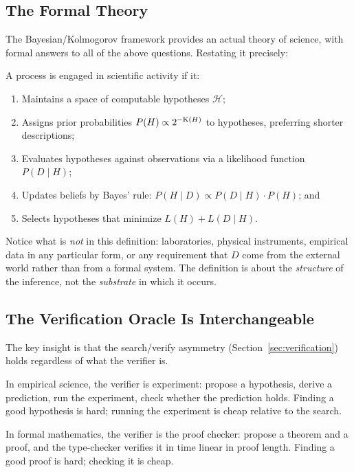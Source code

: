 \subsection{The Formal Theory}

The Bayesian/Kolmogorov framework provides an actual theory of science,
with formal answers to all of the above questions. Restating it
precisely:

\begin{definition}
  A process is engaged in scientific activity if it:
  \begin{enumerate}
    \item Maintains a space of computable hypotheses $\mathcal{H}$;
    \item Assigns prior probabilities $P(H) \propto 2^{-\mathrm{K}(H)}$ to
          hypotheses, preferring shorter descriptions;
    \item Evaluates hypotheses against observations via a likelihood
          function $P(D \mid H)$;
    \item Updates beliefs by Bayes' rule: $P(H \mid D) \propto
          P(D \mid H) \cdot P(H)$; and
    \item Selects hypotheses that minimize $L(H) + L(D \mid H)$.
  \end{enumerate}
\end{definition}

Notice what is \emph{not} in this definition: laboratories, physical
instruments, empirical data in any particular form, or any requirement
that $D$ come from the external world rather than from a formal system.
The definition is about the \emph{structure} of the inference, not the
\emph{substrate} in which it occurs.

\subsection{The Verification Oracle Is Interchangeable}

The key insight is that the search/verify asymmetry
(Section~\ref{sec:verification}) holds regardless of what the verifier
is.

In empirical science, the verifier is experiment: propose a hypothesis,
derive a prediction, run the experiment, check whether the prediction
holds. Finding a good hypothesis is hard; running the experiment is
cheap relative to the search.

In formal mathematics, the verifier is the proof checker: propose a
theorem and a proof, and the type-checker verifies it in time linear
in proof length. Finding a good proof is hard; checking it is cheap.

